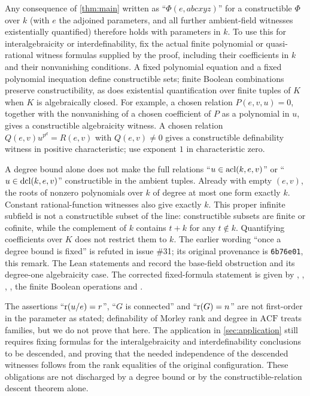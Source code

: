 \begin{remark}\label{rem:descent-limits}
Any consequence of \cref{thm:main} written as ``$\Phi(e,abcxyz)$'' for a
constructible $\Phi$ over $k$ (with $e$ the adjoined parameters, and all further
ambient-field witnesses existentially quantified) therefore holds with parameters
in $k$. To use this for interalgebraicity or interdefinability, fix the actual
finite polynomial or quasi-rational witness formulas supplied by the proof,
including their coefficients in $k$ and their nonvanishing conditions. A fixed
polynomial equation and a fixed polynomial inequation define constructible sets;
finite Boolean combinations preserve constructibility, as does existential
quantification over finite tuples of $K$ when $K$ is algebraically closed. For
example, a chosen relation
$P(e,v,u)=0$, together with the nonvanishing of a chosen coefficient of $P$ as a
polynomial in $u$, gives a constructible algebraicity witness. A chosen relation
$Q(e,v)u^{p^d}=R(e,v)$ with $Q(e,v)\ne0$ gives a constructible definability witness
in positive characteristic; use exponent $1$ in characteristic zero.

A degree bound alone does not make the full relations ``$u\in\operatorname{acl}(k,e,v)$'' or
``$u\in\operatorname{dcl}(k,e,v)$'' constructible in the ambient tuples. Already with empty
$(e,v)$, the roots of nonzero polynomials over $k$ of degree at most one form
exactly $k$. Constant rational-function witnesses also give exactly $k$. This
proper infinite subfield is not a constructible subset of the line: constructible
subsets are finite or cofinite, while the complement of $k$ contains $t+k$ for
any $t\notin k$. Quantifying coefficients over $K$ does not restrict them to $k$.
The earlier wording ``once a degree bound is fixed'' is refuted in issue \#31;
its original provenance is \texttt{6b76e01}, this remark. The Lean statements
 and
record the base-field obstruction and its degree-one algebraicity case. The
corrected fixed-formula statement is given by
,
,
,
, the finite Boolean
operations and .

The assertions ``$\operatorname{r}(u/e)=r$'', ``$G$ is connected'' and ``$\operatorname{r}(G)=n$'' are not
first-order in the parameter as stated; definability of Morley rank and degree
in $\mathrm{ACF}$ treats families, but we do not prove that here. The application
in \cref{sec:application} still requires fixing formulas for the
interalgebraicity and interdefinability conclusions to be descended, and proving
that the needed independence of the descended witnesses follows from the rank
equalities of the original configuration. These obligations are not discharged
by a degree bound or by the constructible-relation descent theorem alone.
\end{remark}
